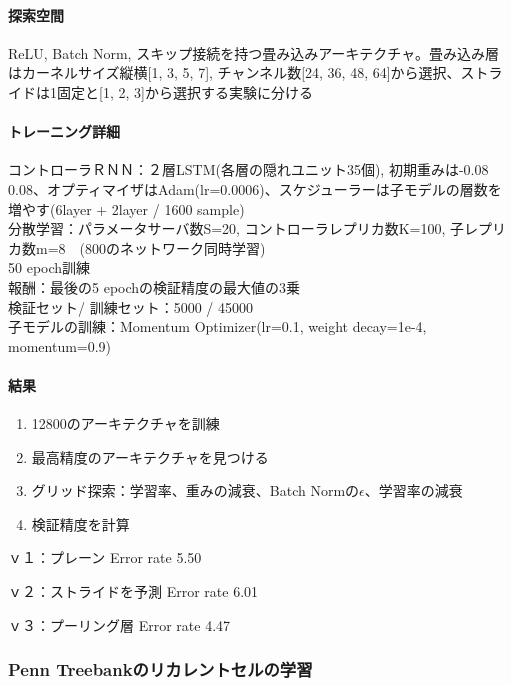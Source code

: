 \documentclass[twocolumn]{jarticle}     %
\begin{document}
\paragraph{探索空間}
ReLU, Batch Norm, スキップ接続を持つ畳み込みアーキテクチャ。畳み込み層はカーネルサイズ縦横[1, 3, 5, 7], チャンネル数[24, 36, 48, 64]から選択、ストライドは1固定と[1, 2, 3]から選択する実験に分ける

\paragraph{トレーニング詳細}
コントローラＲＮＮ：２層LSTM(各層の隠れユニット35個), 初期重みは-0.08 ~ 0.08、オプティマイザはAdam(lr=0.0006)、スケジューラーは子モデルの層数を増やす(6layer + 2layer / 1600 sample)\\
分散学習：パラメータサーバ数S=20, コントローラレプリカ数K=100, 子レプリカ数m=8　(800のネットワーク同時学習)\\
50 epoch訓練\\
報酬：最後の5 epochの検証精度の最大値の3乗\\
検証セット/ 訓練セット：5000 / 45000\\
子モデルの訓練：Momentum Optimizer(lr=0.1, weight decay=1e-4, momentum=0.9)

\paragraph{結果}
\begin{enumerate}
  \item 12800のアーキテクチャを訓練
  \item 最高精度のアーキテクチャを見つける
  \item グリッド探索：学習率、重みの減衰、Batch Normの$\epsilon$、学習率の減衰
  \item 検証精度を計算
\end{enumerate}

ｖ１：プレーン
Error rate 5.50%

ｖ２：ストライドを予測
Error rate 6.01%

ｖ３：プーリング層
Error rate 4.47%

\subsubsection{Penn Treebankのリカレントセルの学習}
\end{document}
